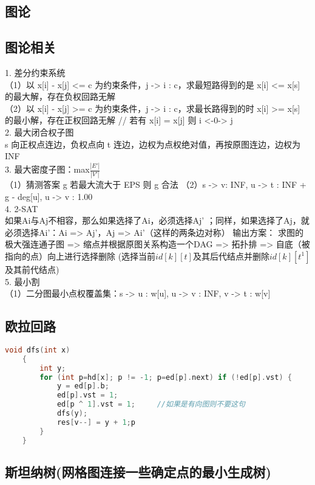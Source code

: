 \documentclass[landscape,a4paper]{article}
\begin{document}
\begin{spacing}{0.3}
\begin{multicols}{3}
	\section{图论}
		\subsection{图论相关}
		
		1. 差分约束系统\\
  （1）以 x[i] - x[j] <= c 为约束条件，j -> i : c，求最短路得到的是 x[i] <= x[s] 的最大解，存在负权回路无解\\
  （2）以 x[i] - x[j] >= c 为约束条件，j -> i : c，求最长路得到的时 x[i] >= x[s] 的最小解，存在正权回路无解
  // 若有 x[i] = x[j] 则 i <-0-> j\\
2. 最大闭合权子图\\
  s 向正权点连边，负权点向 t 连边，边权为点权绝对值，再按原图连边，边权为INF\\
3. 最大密度子图：max{$\frac{|E'|}{|V'|}$}\\
  （1）猜测答案 g 若最大流大于 EPS 则 g 合法
  （2）s -> v: INF, u -> t : INF + g - deg[u], u -> v : 1.00\\
4. 2-SAT\\
  如果Ai与Aj不相容，那么如果选择了Ai，必须选择Aj' ；同样，如果选择了Aj，就必须选择Ai'：Ai => Aj'，Aj => Ai'（这样的两条边对称）
  输出方案：  求图的极大强连通子图 => 缩点并根据原图关系构造一个DAG => 拓扑排 => 自底（被指向的点）向上进行选择删除
(选择当前$id[k][t]$及其后代结点并删除$id[k][t^1]$及其前代结点)\\
5. 最小割\\

（1）二分图最小点权覆盖集：s -> u : w[u], u -> v : INF, v -> t : w[v]\\


\subsection{欧拉回路}
\begin{lstlisting}[language=C++]
	void dfs(int x)
	{
    	int y;
   	 	for (int p=hd[x]; p != -1; p=ed[p].next) if (!ed[p].vst) {
       	 	y = ed[p].b;
        	ed[p].vst = 1;
        	ed[p ^ 1].vst = 1;     //如果是有向图则不要这句
        	dfs(y);
        	res[v--] = y + 1;p
    	}
	}
\end{lstlisting}
		  \subsection{斯坦纳树(网格图连接一些确定点的最小生成树)}
		

\end{multicols}
\end{spacing}
\end{document}
